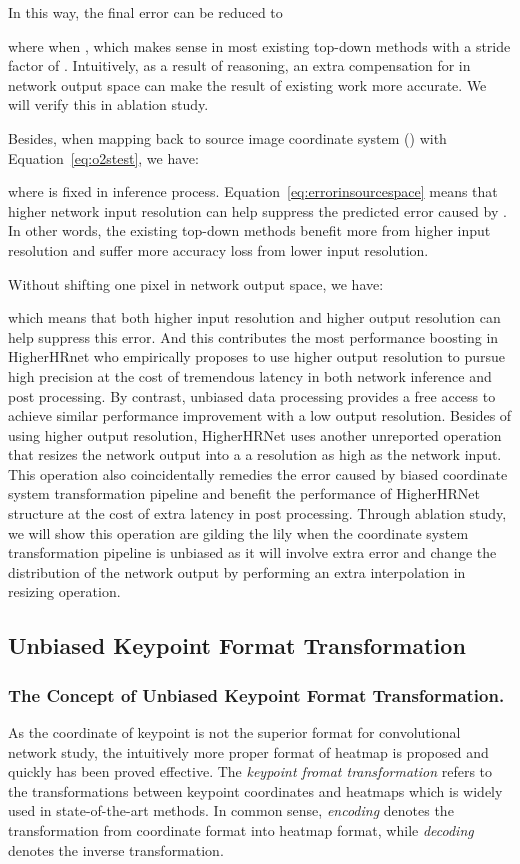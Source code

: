 \documentclass[10pt,journal,compsoc]{IEEEtran}
\begin{document}
In this way, the final error can be reduced to

where  when , which makes sense in most existing top-down methods with a stride factor of  \cite{CPN, MSPN, SBNet, HRNet, DARK}. Intuitively, as a result of reasoning, an extra compensation for  in network output space can make the result of existing work more accurate. We will verify this in ablation study.

Besides, when mapping  back to source image coordinate system () with Equation~\ref{eq:o2stest}, we have:

where  is fixed in inference process. Equation~\ref{eq:errorinsourcespace} means that higher network input resolution can help suppress the predicted error caused by . In other words, the existing top-down methods benefit more from higher input resolution and suffer more accuracy loss from lower input resolution.

Without shifting one pixel in network output space, we have:

which means that both higher input resolution and higher output resolution can help suppress this error. And this contributes the most performance boosting in HigherHRnet \cite{Higher} who empirically proposes to use higher output resolution to pursue high precision at the cost of tremendous latency in both network inference and post processing. By contrast, unbiased data processing provides a free access to achieve similar performance improvement with a low output resolution. Besides of using higher output resolution, HigherHRNet uses another unreported operation that resizes the network output into a a resolution as high as the network input. This operation also coincidentally remedies the error caused by biased coordinate system transformation pipeline and benefit the performance of HigherHRNet structure at the cost of extra latency in post processing. Through ablation study, we will show this operation are gilding the lily when the coordinate system transformation pipeline is unbiased as it will involve extra error and change the distribution of the network output by performing an extra interpolation in resizing operation.


\subsection{Unbiased Keypoint Format Transformation}
\subsubsection{The Concept of Unbiased Keypoint Format Transformation.}
As the coordinate of keypoint is not the superior format for convolutional network study, the intuitively more proper format of heatmap is proposed and quickly has been proved effective. The \textit{keypoint fromat transformation} refers to the transformations between keypoint coordinates and heatmaps which is widely used in state-of-the-art methods. In common sense, \textit{encoding} denotes the transformation from coordinate format into heatmap format, while \textit{decoding} denotes the inverse transformation.
\end{document}
